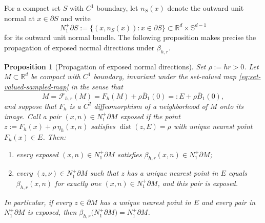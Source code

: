 \documentclass[pdflatex,sn-mathphys-num]{sn-jnl}
\numberwithin{equation}{section}
\theoremstyle{thmstyleone}%
\newtheorem{proposition}[theorem]{Proposition}
\theoremstyle{definition}
\theoremstyle{remark}
\begin{document}
For a compact set $S$ with $C^1$ boundary, let $n_S(x)$ denote the outward unit normal at $x\in\partial S$ and write $$
    N^+_1\partial S
    :=
    \bigl\{(x,n_S(x)):x\in\partial S\bigr\}
    \subset\mathbb R^d\times\mathbb S^{d-1}
$$
for its outward unit normal bundle. The following proposition makes precise the propagation of exposed normal directions under $\beta_{h,r}$.

\begin{proposition}[Propagation of exposed normal directions]
\label{prop:normal-bundle-invariance}
Set $\rho:=hr>0$. Let $M\subset\mathbb R^d$ be compact with $C^1$ boundary, invariant under the set-valued map
\eqref{eq:set-valued-sampled-map} in the sense that
$$
    M
    =
    \mathcal F_{h,r}(M)
    =
    F_h(M)+\rho\overline B_1(0)
    =:
    E+\rho\overline B_1(0),
$$
and suppose that $F_h$ is a $C^2$ diffeomorphism of a neighborhood of $M$ onto its image. Call a pair $(x,n)\in N^+_1\partial M$ exposed if the point $z:=F_h(x)+\rho\,\eta_h(x,n)$ satisfies $\operatorname{dist}(z,E)=\rho$ with unique nearest point $F_h(x)\in E$. Then:
\begin{enumerate}
    \item every exposed $(x,n)\in N^+_1\partial M$ satisfies
    $\beta_{h,r}(x,n)\in N^+_1\partial M$;
    \item every $(z,\nu)\in N^+_1\partial M$ such that $z$ has a unique nearest point in $E$ equals $\beta_{h,r}(x,n)$ for exactly one $(x,n)\in N^+_1\partial M$, and this pair is exposed.
\end{enumerate}
In particular, if every $z\in\partial M$ has a unique nearest point in $E$ and every pair in $N^+_1\partial M$ is exposed, then $\beta_{h,r}
    \bigl(N^+_1\partial M\bigr)
    =
    N^+_1\partial M$.
\end{proposition}
\end{document}
